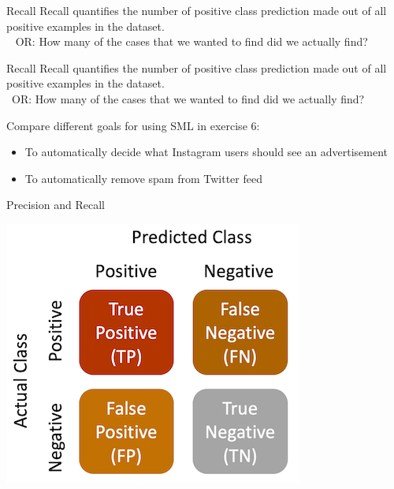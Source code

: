 \documentclass[compress]{beamer}
\begin{document}
\begin{frame}{Recall}
Recall quantifies the number of positive class prediction made out of all positive examples in the dataset. \\\
\pause
OR: How many of the cases that we wanted to find did we actually find?
\end{frame}


\begin{frame}{Recall}
Recall quantifies the number of positive class prediction made out of all positive examples in the dataset. \\\
OR: How many of the cases that we wanted to find did we actually find?
	
\begin{alertblock}{Compare different goals for using SML in exercise 6:}
\begin{itemize}
	\item To automatically decide what Instagram users should see an advertisement
	\item To automatically remove spam from Twitter feed
\end{itemize}
\end{alertblock}
\end{frame}

\begin{frame}{Precision and Recall}
\begin{center}
	\includegraphics[width=\linewidth,height=\textheight,keepaspectratio]{../pictures/confusionmatrix_words.png} \\\
\end{center}
\end{frame}
\end{document}
